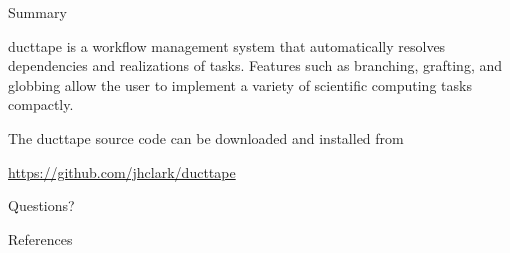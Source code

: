 \documentclass[10pt]{beamer}
\begin{document}
\begin{frame}{Summary}

  ducttape is a workflow management system that automatically resolves dependencies and realizations of tasks. Features such as branching, grafting, and globbing allow the user to implement a variety of scientific computing tasks compactly.
  
  The ducttape source code can be downloaded and installed from

  \begin{center}\url{https://github.com/jhclark/ducttape}\end{center}

\end{frame}

\begin{frame}[standout]
  Questions?
\end{frame}

\begin{frame}[allowframebreaks]{References}

  
  

\end{frame}
\end{document}
